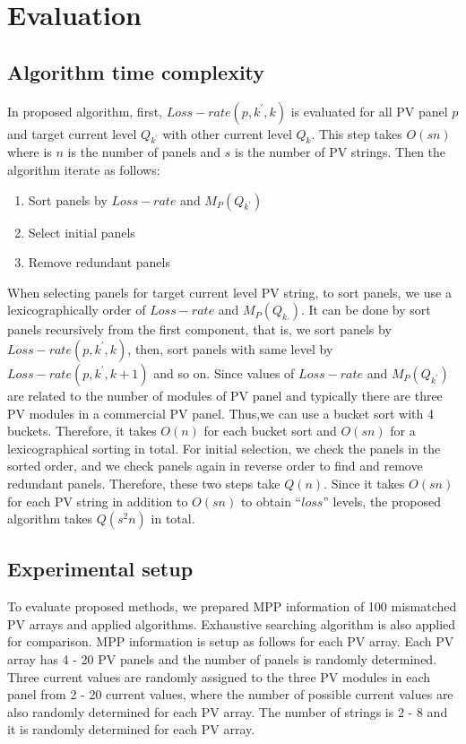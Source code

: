 \documentclass[journal]{IEEEtran}
\begin{document}
  
\section{Evaluation}\label{sec:evaluation}
\subsection{Algorithm time complexity}\label{sec:algor-time-compl}
In proposed algorithm, first, $Loss-rate(p,k^{'},k)$ is evaluated for all PV panel $p$ and target current level $Q_{k^{'}}$ with other current level $Q_{k}$.
This step takes $O(sn)$ where is $n$ is the number of panels and $s$ is the number of PV strings.
Then the algorithm iterate as follows:
\begin{enumerate}
\item\label{item:1} Sort panels by $Loss-rate$ and $M_{P}(Q_{k^{'}})$
\item\label{item:2} Select initial panels
\item\label{item:3} Remove redundant panels
\end{enumerate}

When selecting panels for target current level PV string, to sort panels, we use a lexicographically order of $Loss-rate$ and $M_{P}(Q_{k_{'}})$.
It can be done by sort panels recursively from the first component, that is, we sort panels by $Loss-rate(p,k^{'},k)$, then, sort panels with same level by $Loss-rate(p,k^{'},k+1)$ and so on.
Since values of $Loss-rate$ and $M_{P}(Q_{k^{'}})$ are related to the number of modules of PV panel and typically there are three PV modules in a commercial PV panel.
Thus,we can use a bucket sort with 4 buckets.
Therefore, it takes $O(n)$ for each bucket sort and $O(sn)$ for a lexicographical sorting in total.
For initial selection, we check the panels in the sorted order, and we check panels again in reverse order to find and remove redundant panels.
Therefore, these two steps take $Q(n)$.
Since it takes $O(sn)$ for each PV string in addition to $O(sn)$ to obtain ``$loss$'' levels, the proposed algorithm takes $Q(s^{2}n)$ in total.
\subsection{Experimental setup}\label{sec:experimental-setup}
To evaluate proposed methods, we prepared MPP information of 100 mismatched PV arrays and applied algorithms.
Exhaustive searching algorithm is also applied for comparison.
MPP information is setup as follows for each PV array.
Each PV array has 4 - 20 PV panels and the number of panels is randomly determined.
Three current values are randomly assigned to the three PV modules in each panel from 2 - 20 current values, where the number of possible current values are also randomly determined for each PV array.
The number of strings is 2 - 8 and it is randomly determined for each PV array.
\end{document}
